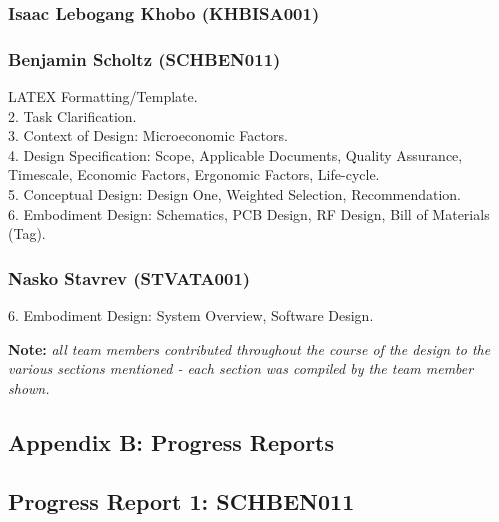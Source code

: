 \subsubsection*{Isaac Lebogang Khobo (KHBISA001)}
\subsubsection*{Benjamin Scholtz (SCHBEN011)}
LATEX Formatting/Template. \\
2. Task Clarification. \\
3. Context of Design: Microeconomic Factors. \\
4. Design Specification: Scope, Applicable Documents, Quality Assurance, Timescale, Economic Factors, Ergonomic Factors, Life-cycle. \\
5. Conceptual Design: Design One, Weighted Selection, Recommendation. \\
6. Embodiment Design: Schematics, PCB Design, RF Design, Bill of Materials (Tag). \\
\subsubsection*{Nasko Stavrev (STVATA001)}
6. Embodiment Design: System Overview, Software Design.

\vfill
\textbf{Note: }\textit{all team members contributed throughout the course of the design to the various sections mentioned - each section was compiled by the team member shown.}

\newpage
\vspace*{\fill}
\begin{center}
\subsection*{Appendix B: Progress Reports}
\end{center}
\vspace*{\fill}

\newpage
\vspace*{\fill}
\begin{center}
\subsection*{Progress Report 1: SCHBEN011}
\end{center}
\vspace*{\fill}


